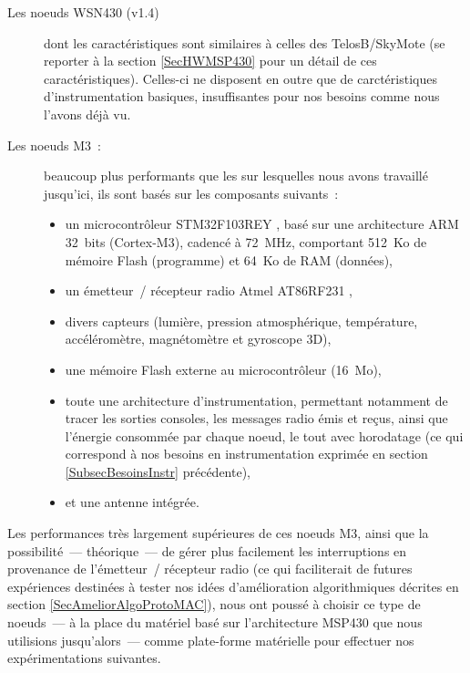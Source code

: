\begin{description}

\item[Les noeuds WSN430 (v1.4)] dont les caractéristiques sont similaires
à celles des  TelosB/SkyMote (se reporter à la section
\vref{SecHWMSP430} pour un détail de ces caractéristiques). Celles-ci
ne disposent en outre que de carctéristiques d'instrumentation basiques,
insuffisantes pour nos besoins comme nous l'avons déjà vu.

\item[Les noeuds M3~:] beaucoup plus performants que les 
sur lesquelles nous avons travaillé jusqu'ici, ils sont basés sur les
composants suivants~:
\begin{itemize}
\item un microcontrôleur STM32F103REY \cite{DSSTM32F103RE}, basé sur une
architecture ARM 32~bits (Cortex-M3), cadencé à 72~MHz, comportant 512~Ko
de mémoire Flash (programme) et 64~Ko de RAM (données),
\item un émetteur~/ récepteur radio Atmel AT86RF231 \cite{DSAT86RF231},
\item divers capteurs (lumière, pression atmosphérique, température,
accéléromètre, magnétomètre et gyroscope 3D),
\item une mémoire Flash externe au microcontrôleur (16~Mo),
\item toute une architecture d'instrumentation, permettant notamment de
tracer les sorties consoles, les messages radio émis et reçus, ainsi que
l'énergie consommée par chaque noeud, le tout avec horodatage (ce qui
correspond à nos besoins en instrumentation exprimée en section
\ref{SubsecBesoinsInstr} précédente),
\item et une antenne intégrée.
\end{itemize}

\end{description}

Les performances très largement supérieures de ces noeuds M3, ainsi que
la possibilité~--- théorique~--- de gérer plus facilement les interruptions
en provenance de l'émetteur~/ récepteur radio (ce qui faciliterait de
futures expériences destinées à tester nos idées d'amélioration
algorithmiques décrites en section \vref{SecAmeliorAlgoProtoMAC}), nous
ont poussé à choisir ce type de noeuds~--- à la place du matériel basé
sur l'architecture MSP430 que nous utilisions jusqu'alors~--- comme
plate-forme matérielle pour effectuer nos expérimentations suivantes.


